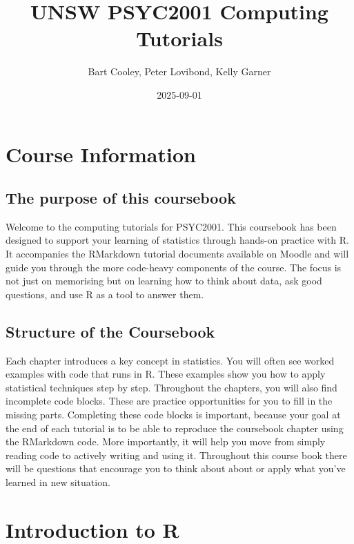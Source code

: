 \documentclass[
]{book}
\title{UNSW PSYC2001 Computing Tutorials}
\author{Bart Cooley, Peter Lovibond, Kelly Garner}
\date{2025-09-01}
\begin{document}
\maketitle

{
\setcounter{tocdepth}{1}
\tableofcontents
}
\chapter*{Course Information}\label{course-information}

\section{The purpose of this coursebook}\label{the-purpose-of-this-coursebook}

Welcome to the computing tutorials for PSYC2001. This coursebook has been designed to support your learning of statistics through hands-on practice with R. It accompanies the RMarkdown tutorial documents available on Moodle and will guide you through the more code-heavy components of the course. The focus is not just on memorising but on learning how to think about data, ask good questions, and use R as a tool to answer them.

\section{Structure of the Coursebook}\label{structure-of-the-coursebook}

Each chapter introduces a key concept in statistics. You will often see worked examples with code that runs in R. These examples show you how to apply statistical techniques step by step. Throughout the chapters, you will also find incomplete code blocks. These are practice opportunities for you to fill in the missing parts. Completing these code blocks is important, because your goal at the end of each tutorial is to be able to reproduce the coursebook chapter using the RMarkdown code. More importantly, it will help you move from simply reading code to actively writing and using it. Throughout this course book there will be questions that encourage you to think about about or apply what you've learned in new situation.

\chapter{Introduction to R}\label{introduction-to-r}
\end{document}
